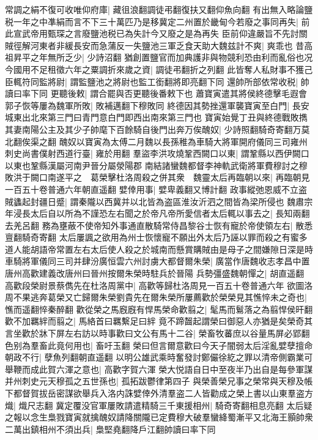 常調之絹不復可收唯仰府庫|{
	藏徂浪翻調徒弔翻復扶又翻仰魚向翻}
有出無入略論鹽税一年之中凖絹而言不下三十萬匹乃是移冀定二州置於畿甸今若廢之事同再失|{
	前此宣武帝用甄琛之言廢鹽池税已為失計今又廢之是為再失}
臣前仰違嚴旨不先討關賊徑解河東者非緩長安而急蒲反一失鹽池三軍乏食天助大魏兹計不爽|{
	爽乖也}
昔高祖昇平之年無所乏少|{
	少詩沼翻}
猶創置鹽官而加典護非與物競利恐由利而亂俗也况今國用不足租徵六年之粟調折來歲之資|{
	調徒弔翻折之列翻}
此皆奪人私財事不獲己臣輒符同監將尉|{
	謂監鹽池之將尉也監工銜翻將即亮翻下同}
還帥所部依常收税|{
	帥讀曰率下同}
更聽後敕|{
	謂合罷與否更聽後番敕下也}
蕭寶寅遣其將侯終德擊毛遐會郭子恢等屢為魏軍所敗|{
	敗補邁翻下穆敗同}
終德因其勢挫還軍襲寶寅至白門|{
	長安城東出北來第三門曰青門意白門即西出南來第三門也}
寶寅始覺丁丑與終德戰敗擕其妻南陽公主及其少子帥麾下百餘騎自後門出奔万俟醜奴|{
	少詩照翻騎奇寄翻万莫北翻俟渠之翻}
醜奴以寶寅為太傅二月魏以長孫稚為車騎大將軍開府儀同三司雍州刺史尚書僕射西道行臺|{
	雍於用翻}
羣盜李洪攻燒鞏西闕口以東|{
	謂鞏縣以西伊闕口以東也鞏縣漢屬河南尹晉分屬滎陽郡}
南結諸蠻魏都督李神軌武衛將軍費穆討之穆敗洪于闕口南遂平之　葛榮擊杜洛周殺之併其衆　魏靈太后再臨朝以來|{
	再臨朝見一百五十卷普通六年朝直遥翻}
嬖倖用事|{
	嬖卑義翻又博計翻}
政事縱弛恩威不立盗賊蠭起封疆日蹙|{
	謂秦隴以西冀并以北皆為盗區淮汝沂泗之間皆為梁所侵也}
魏肅宗年浸長太后自以所為不謹恐左右聞之於帝凡帝所愛信者太后輒以事去之|{
	長知兩翻去羌呂翻}
務為壅蔽不使帝知外事通直散騎常侍昌黎谷士恢有寵於帝使領左右|{
	散悉亶翻騎奇寄翻}
太后屢諷之欲用為州士恢懷寵不願出外太后乃誣以罪而殺之有蜜多道人能胡語帝常置左右太后使人殺之於城南而懸賞購賊由是母子之間嫌隙日深是時車騎將軍儀同三司并肆汾廣恒雲六州討虜大都督爾朱榮|{
	廣當作唐魏收志孝昌中置唐州高歡建義改唐州曰晉州按爾朱榮時駐兵於晉陽}
兵勢彊盛魏朝憚之|{
	胡直遥翻}
高歡段榮尉景蔡儁先在杜洛周黨中|{
	高歡等歸杜洛周見一百五十卷普通六年}
欲圖洛周不果逃奔葛榮又亡歸爾朱榮劉貴先在爾朱榮所屢薦歡於榮榮見其憔悴未之奇也|{
	憔而遥翻悴秦醉翻}
歡從榮之馬廐廐有悍馬榮命歡翦之|{
	髦馬而鬄落之為翦悍侯旰翻}
歡不加羈絆而翦之|{
	馬絡首曰羈繫足曰絆}
竟不蹄齧起謂榮曰御惡人亦猶是矣榮奇其言坐歡於牀下屏左右訪以時事歡曰文公有馬十二谷|{
	榮畜牧蕃庶以谷量馬屏必郢翻}
色别為羣畜此竟何用也|{
	畜吁玉翻}
榮曰但言爾意歡曰今天子闇弱太后淫亂嬖孽擅命朝政不行|{
	孽魚列翻朝直遥翻}
以明公雄武乘時奮發討鄭儼徐紇之罪以清帝側霸業可舉鞭而成此賀六渾之意也|{
	高歡字賀六渾}
榮大悦語自日中至夜半乃出自是每參軍謀并州刺史元天穆孤之五世孫也|{
	孤拓跋鬱律第四子}
與榮善榮兄事之榮常與天穆及帳下都督賀拔岳密謀欲舉兵入洛内誅嬖倖外清羣盗二人皆勸成之榮上書以山東羣盗方熾|{
	熾尺志翻}
冀定覆没官軍屢敗請遣精騎三千東援相州|{
	騎奇寄翻相息亮翻}
太后疑之報以念生梟戮寶寅就擒醜奴請降關隴已定費穆大破羣蠻絳蜀漸平又北海王顥帥衆二萬出鎮相州不須出兵|{
	梟堅堯翻降戶江翻帥讀曰率下同}
